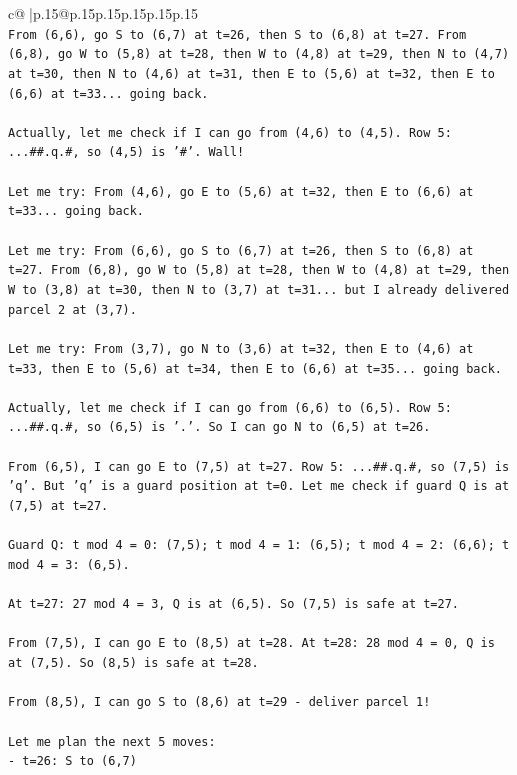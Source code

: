 \documentclass{article}
\begin{document}
{\begin{supertabular}{c@{$\;$}|p{.15\linewidth}@{}p{.15\linewidth}p{.15\linewidth}p{.15\linewidth}p{.15\linewidth}p{.15\linewidth}}
{{{\\ 
\texttt{From (6,6), go S to (6,7) at t=26, then S to (6,8) at t=27. From (6,8), go W to (5,8) at t=28, then W to (4,8) at t=29, then N to (4,7) at t=30, then N to (4,6) at t=31, then E to (5,6) at t=32, then E to (6,6) at t=33... going back.} \\
\\ 
\texttt{Actually, let me check if I can go from (4,6) to (4,5). Row 5: ...\#\#.q.\#, so (4,5) is '\#'. Wall!} \\
\\ 
\texttt{Let me try: From (4,6), go E to (5,6) at t=32, then E to (6,6) at t=33... going back.} \\
\\ 
\texttt{Let me try: From (6,6), go S to (6,7) at t=26, then S to (6,8) at t=27. From (6,8), go W to (5,8) at t=28, then W to (4,8) at t=29, then W to (3,8) at t=30, then N to (3,7) at t=31... but I already delivered parcel 2 at (3,7).} \\
\\ 
\texttt{Let me try: From (3,7), go N to (3,6) at t=32, then E to (4,6) at t=33, then E to (5,6) at t=34, then E to (6,6) at t=35... going back.} \\
\\ 
\texttt{Actually, let me check if I can go from (6,6) to (6,5). Row 5: ...\#\#.q.\#, so (6,5) is '.'. So I can go N to (6,5) at t=26.} \\
\\ 
\texttt{From (6,5), I can go E to (7,5) at t=27. Row 5: ...\#\#.q.\#, so (7,5) is 'q'. But 'q' is a guard position at t=0. Let me check if guard Q is at (7,5) at t=27.} \\
\\ 
\texttt{Guard Q: t mod 4 = 0: (7,5); t mod 4 = 1: (6,5); t mod 4 = 2: (6,6); t mod 4 = 3: (6,5).} \\
\\ 
\texttt{At t=27: 27 mod 4 = 3, Q is at (6,5). So (7,5) is safe at t=27.} \\
\\ 
\texttt{From (7,5), I can go E to (8,5) at t=28. At t=28: 28 mod 4 = 0, Q is at (7,5). So (8,5) is safe at t=28.} \\
\\ 
\texttt{From (8,5), I can go S to (8,6) at t=29 {-} deliver parcel 1!} \\
\\ 
\texttt{Let me plan the next 5 moves:} \\
\texttt{{-} t=26: S to (6,7)} \\
}}}
\end{supertabular}}
\end{document}
